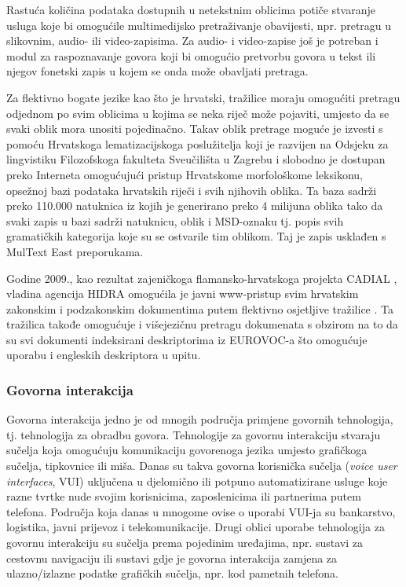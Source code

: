 \begin{multicols}{2}
Rastuća količina podataka dostupnih u netekstnim oblicima potiče stvaranje usluga koje bi omogućile multimedijsko pretraživanje obavijesti, npr. pretragu u slikovnim, audio- ili video-zapisima. Za audio- i video-zapise još je potreban i modul za raspoznavanje govora koji bi omogućio pretvorbu govora u tekst ili njegov fonetski zapis u kojem se onda može obavljati pretraga.

Za flektivno bogate jezike kao što je hrvatski, tražilice moraju omogućiti pretragu odjednom po svim oblicima u kojima se neka riječ može pojaviti, umjesto da se svaki oblik mora unositi pojedinačno. Takav oblik pretrage moguće je izvesti s pomoću Hrvatskoga lematizacijskoga poslužitelja koji je razvijen na Odsjeku za lingvistiku Filozofskoga fakulteta Sveučilišta u Zagrebu i slobodno je dostupan preko Interneta \cite{str16} omogućujući pristup Hrvatskome morfološkome leksikonu, opsežnoj bazi podataka hrvatskih riječi i svih njihovih oblika. Ta baza sadrži preko 110.000 natuknica iz kojih je generirano preko 4 milijuna oblika tako da svaki zapis u bazi sadrži natuknicu, oblik i MSD-oznaku tj. popis svih gramatičkih kategorija koje su se ostvarile tim oblikom. Taj je zapis usklađen s MulText East \cite{str17} preporukama.

Godine 2009., kao rezultat zajeničkoga flamansko-hrvatskoga projekta CADIAL \cite{str18}, vladina agencija HIDRA omogućila je javni www-pristup svim hrvatskim zakonskim i podzakonskim dokumentima putem flektivno osjetljive tražilice \cite{str19}. Ta tražilica takođe omogućuje i višejezičnu pretragu dokumenata s obzirom na to da su svi dokumenti indeksirani deskriptorima iz EUROVOC-a što omogućuje uporabu i engleskih deskriptora u upitu.

  
\subsubsection{Govorna interakcija}

Govorna interakcija jedno je od mnogih područja primjene govornih tehnologija, tj. tehnologija za obradbu govora. Tehnologije za govornu interakciju stvaraju sučelja koja omogućuju komunikaciju govorenoga jezika umjesto grafičkoga sučelja, tipkovnice ili miša. Danas su takva govorna korisnička sučelja (\emph{voice user interfaces}, VUI) uključena u djelomično ili potpuno automatizirane usluge koje razne tvrtke nude svojim korisnicima, zaposlenicima ili partnerima putem telefona. Područja koja danas u mnogome ovise o uporabi VUI-ja su bankarstvo, logistika, javni prijevoz i telekomunikacije. Drugi oblici uporabe tehnologija za govornu interakciju su sučelja prema pojedinim uređajima, npr. sustavi za cestovnu navigaciju ili sustavi gdje je govorna interakcija zamjena za ulazno/izlazne podatke grafičkih sučelja, npr. kod pametnih telefona.


\end{multicols}
